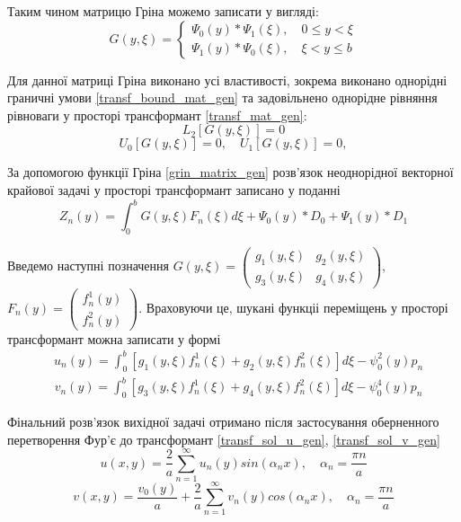 Таким чином матрицю Гріна можемо записати у вигляді:
\begin{equation}\label{grin_matrix_gen}
    G(y,\xi) = 
    \begin{cases}
        \Psi_0(y) * \Psi_1(\xi), \quad 0 \le y < \xi \\
        \Psi_1(y) * \Psi_0(\xi), \quad \xi < y \le b
    \end{cases}
\end{equation}

Для данної матриці Гріна виконано усі властивості, зокрема виконано однорідні граничні умови \eqref{transf_bound_mat_gen}
та задовільнено однорідне рівняння рівноваги у просторі трансформант \eqref{transf_mat_gen}:
\begin{equation*}
    L_2\left[  G(y, \xi) \right] = 0
\end{equation*}
\begin{equation*}
    U_0\left[ G(y, \xi) \right] = 0, \quad  U_1\left[ G(y, \xi) \right] = 0,
\end{equation*}

За допомогою функції Гріна \eqref{grin_matrix_gen} розв'язок неоднорідної векторної крайової задачі у просторі трансформант записано у поданні \cite{popov_2}
\begin{equation}
    Z_n(y) = \int_0^b G(y,\xi) F_n(\xi) d\xi + \Psi_0(y) * D_0 + \Psi_1(y) * D_1
\end{equation}

Введемо наступні позначення $G(y, \xi) = \begin{pmatrix}
    g_1(y,\xi) & g_2(y,\xi) \\
    g_3(y,\xi) & g_4(y,\xi)
\end{pmatrix}$, $F_n(y) = \begin{pmatrix}
    f_n^1(y) \\
    f_n^2(y)
\end{pmatrix}$. Враховуючи це, шукані функціі переміщень у просторі трансформант можна записати у формі
\begin{align}\label{transf_sol_u_gen}
    &u_n(y) = \int_0^b \left[g_1(y, \xi)f_n^1(\xi) + g_2(y, \xi)f_n^2(\xi) \right]d\xi - \psi_0^2(y) p_n
\end{align}
\begin{align}\label{transf_sol_v_gen}
    &v_n(y) = \int_0^b \left[g_3(y, \xi)f_n^1(\xi) + g_4(y, \xi)f_n^2(\xi) \right]d\xi - \psi_0^4(y) p_n
\end{align}

Фінальний розв'язок вихідної задачі отримано після застосування оберненного перетворення Фур'є до трансформант \eqref{transf_sol_u_gen}, \eqref{transf_sol_v_gen}
\begin{equation}\label{final_sol_u_gen}
    u(x,y) = \frac{2}{a} \sum_{n=1}^{\infty} u_n(y) sin(\alpha_n x), \quad \alpha_n = \frac{\pi n}{a}
\end{equation}
\begin{equation}
    v(x,y) = \frac{v_0(y)}{a} + \frac{2}{a} \sum_{n=1}^{\infty} v_n(y) cos(\alpha_n x), \quad \alpha_n = \frac{\pi n}{a}
\end{equation}


